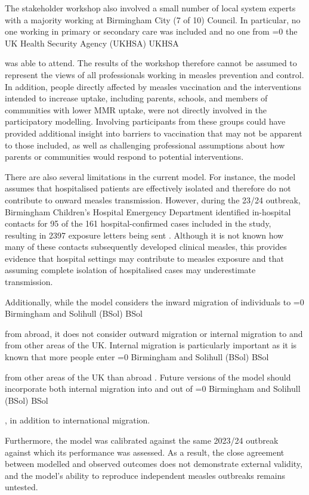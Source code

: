 \documentclass[12pt]{article}
\newcounter{bsol}
\newcommand{\bsol}{%
    \ifnum\value{bsol}=0
        \stepcounter{bsol}%
        Birmingham and Solihull (BSol)%
        \else
        BSol%
    \fi%
    \xspace
}
\newcounter{ukhsa}
\newcommand{\ukhsa}{%
    \ifnum\value{ukhsa}=0
        \stepcounter{ukhsa}%
        the UK Health Security Agency (UKHSA)%
    \else
        UKHSA%
    \fi%
    \xspace
}
\begin{document}
The stakeholder workshop also involved a small number of local system experts with a majority working at Birmingham City (7 of 10) Council. In particular, no one working in primary or secondary care was included and no one from \ukhsa was able to attend. The results of the workshop therefore cannot be assumed to represent the views of all professionals working in measles prevention and control. In addition, people directly affected by measles vaccination and the interventions intended to increase uptake, including parents, schools, and members of communities with lower MMR uptake, were not directly involved in the participatory modelling. Involving participants from these groups could have provided additional insight into barriers to vaccination that may not be apparent to those included, as well as challenging professional assumptions about how parents or communities would respond to potential interventions.

There are also several limitations in the current model. For instance, the model assumes that hospitalised patients are effectively isolated and therefore do not contribute to onward measles transmission. However, during the 23/24 outbreak, Birmingham Children's Hospital Emergency Department identified in-hospital contacts for 95 of the 161 hospital-confirmed cases included in the study, resulting in 2397 exposure letters being sent \cite{HARRIS202541}. Although it is not known how many of these contacts subsequently developed clinical measles, this provides evidence that hospital settings may contribute to measles exposure and that assuming complete isolation of hospitalised cases may underestimate transmission. 

Additionally, while the model considers the inward migration of individuals to \bsol from abroad, it does not consider outward migration or internal migration to and from other areas of the UK. Internal migration is particularly important as it is known that more people enter \bsol from other areas of the UK than abroad \cite{nomis_census2021_od}. Future versions of the model should incorporate both internal migration into and out of \bsol, in addition to international migration. 

Furthermore, the model was calibrated against the same 2023/24 outbreak against which its performance was assessed. As a result, the close agreement between modelled and observed outcomes does not demonstrate external validity, and the model's ability to reproduce independent measles outbreaks remains untested.
\end{document}
